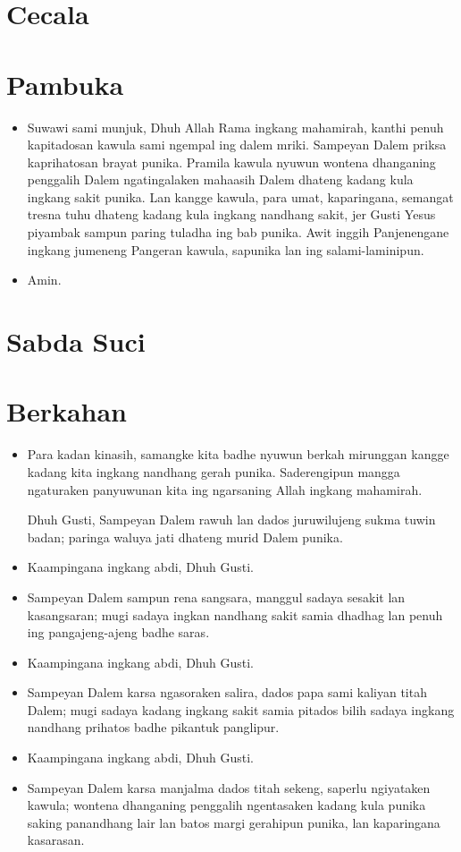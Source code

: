 \documentclass[a4paper,11point]{article}
\newcommand{\BU}[1]{\begin{itemize} \item[U:] #1 \end{itemize}}
\newcommand{\BP}[1]{\begin{itemize} \item[P:] #1 \end{itemize}}
\begin{document}
\section*{Cecala}
\section*{Pambuka}
\BP{Suwawi sami munjuk, Dhuh Allah Rama ingkang mahamirah, kanthi penuh kapitadosan kawula sami ngempal ing dalem mriki. Sampeyan Dalem priksa kaprihatosan brayat punika. Pramila kawula nyuwun wontena dhanganing penggalih Dalem ngatingalaken mahaasih Dalem dhateng kadang kula ingkang sakit punika. Lan kangge kawula, para umat, kaparingana, semangat tresna tuhu dhateng kadang kula ingkang nandhang sakit, jer Gusti Yesus piyambak sampun paring tuladha ing bab punika. Awit inggih Panjenengane ingkang jumeneng Pangeran kawula, sapunika lan ing salami-laminipun.}
\BU{Amin.}

\section*{Sabda Suci}

\section*{Berkahan}
\BP{Para kadan kinasih, samangke kita badhe nyuwun berkah mirunggan kangge kadang kita ingkang nandhang gerah punika. Saderengipun mangga ngaturaken panyuwunan kita ing ngarsaning Allah ingkang mahamirah.

Dhuh Gusti, Sampeyan Dalem rawuh lan dados juruwilujeng sukma tuwin badan; paringa waluya jati dhateng murid Dalem punika.}

\BU{Kaampingana ingkang abdi, Dhuh Gusti.}

\BP{Sampeyan Dalem sampun rena sangsara, manggul sadaya sesakit lan kasangsaran; mugi sadaya ingkan nandhang sakit samia dhadhag lan penuh ing pangajeng-ajeng badhe saras.}

\BU{Kaampingana ingkang abdi, Dhuh Gusti.}

\BP{Sampeyan Dalem karsa ngasoraken salira, dados papa sami kaliyan titah Dalem; mugi sadaya kadang ingkang sakit samia pitados bilih sadaya ingkang nandhang prihatos badhe pikantuk panglipur.}

\BU{Kaampingana ingkang abdi, Dhuh Gusti.}

\BP{Sampeyan Dalem karsa manjalma dados titah sekeng, saperlu ngiyataken kawula; wontena dhanganing penggalih ngentasaken kadang kula punika saking panandhang lair lan batos margi gerahipun punika, lan kaparingana kasarasan.}
\end{document}
